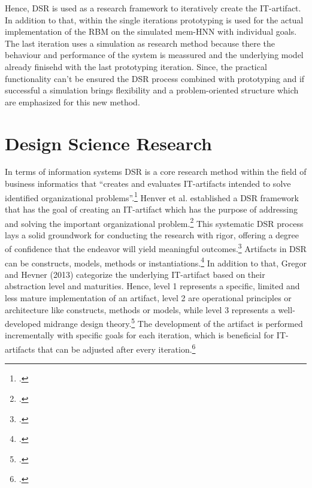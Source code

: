 Hence, \ac{DSR} is used as a research framework to iteratively create the \ac{IT}-artifact. 
In addition to that, within the single iterations prototyping is used for the actual implementation of the \ac{RBM} on the simulated \ac{mem-HNN} with individual goals.
The last iteration uses a simulation as research method because there the behaviour and performance of the system is meassured and the underlying model already finisehd with the last prototyping iteration. 
Since, the practical functionality can't be ensured the \ac{DSR} process combined with prototyping and if successful a simulation 
brings flexibility and a problem-oriented structure which are emphasized for this new method. 

\section{Design Science Research}

In terms of information systems \ac{DSR} is a core research method within the field of business informatics that ``creates and evaluates \ac{IT}-artifacts intended to solve identified organizational problems''.\footcite[77]{hevnerDesignScienceInformation2004a}
Henver et al. established a DSR framework that has the goal of creating an \ac{IT}-artifact which has the purpose of addressing and solving the important organizational problem.\footcite[82]{hevnerDesignScienceInformation2004a}
This systematic \ac{DSR} process lays a solid groundwork for conducting the research with rigor, offering a degree of confidence that the endeavor will yield meaningful outcomes.\footcite[cf.][368]{baskervilleDesignScienceResearch2018}
Artifacts in \ac{DSR} can be constructs, models, methods or instantiations.\footcite[77]{hevnerDesignScienceInformation2004a}
In addition to that, Gregor and Hevner (2013) categorize the underlying \ac{IT}-artifact based on their abstraction level and maturities.
Hence, level 1 represents a specific, limited and less mature implementation of an artifact, level 2 are operational principles or architecture like constructs, methods or models, while level 3 represents a well-developed midrange design theory.\footcite[cf.][342]{gregorPositioningPresentingDesign2013}
The development of the artifact is performed incrementally with specific goals for each iteration, which is beneficial for \ac{IT}-artifacts that can be adjusted after every iteration.\footcite[cf.][343]{gregorPositioningPresentingDesign2013}

